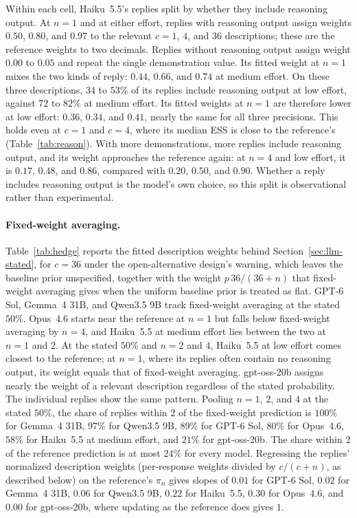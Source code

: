 Within each cell, Haiku~5.5's replies split by whether they include reasoning output. At $n = 1$ and at either effort, replies with reasoning output assign weights $0.50$, $0.80$, and $0.97$ to the relevant $c = 1$, $4$, and $36$ descriptions; these are the reference weights to two decimals. Replies without reasoning output assign weight $0.00$ to $0.05$ and repeat the single demonstration value. Its fitted weight at $n = 1$ mixes the two kinds of reply: $0.44$, $0.66$, and $0.74$ at medium effort. On these three descriptions, $34$ to $53\%$ of its replies include reasoning output at low effort, against $72$ to $82\%$ at medium effort. Its fitted weights at $n = 1$ are therefore lower at low effort: $0.36$, $0.34$, and $0.41$, nearly the same for all three precisions. This holds even at $c=1$ and $c=4$, where its median ESS is close to the reference's (Table~\ref{tab:reason}). With more demonstrations, more replies include reasoning output, and its weight approaches the reference again: at $n = 4$ and low effort, it is $0.17$, $0.48$, and $0.86$, compared with $0.20$, $0.50$, and $0.90$. Whether a reply includes reasoning output is the model's own choice, so this split is observational rather than experimental.

\paragraph{Fixed-weight averaging.}
Table~\ref{tab:hedge} reports the fitted description weights behind Section~\ref{sec:llm-stated}, for $c=36$ under the open-alternative design's warning, which leaves the baseline prior unspecified, together with the weight $p\,36/(36+n)$ that fixed-weight averaging gives when the uniform baseline prior is treated as flat. GPT-6 Sol, Gemma~4 31B, and Qwen3.5 9B track fixed-weight averaging at the stated $50\%$. Opus~4.6 starts near the reference at $n=1$ but falls below fixed-weight averaging by $n=4$, and Haiku~5.5 at medium effort lies between the two at $n=1$ and $2$. At the stated $50\%$ and $n=2$ and $4$, Haiku~5.5 at low effort comes closest to the reference; at $n=1$, where its replies often contain no reasoning output, its weight equals that of fixed-weight averaging. gpt-oss-20b assigns nearly the weight of a relevant description regardless of the stated probability. The individual replies show the same pattern. Pooling $n=1$, $2$, and $4$ at the stated $50\%$, the share of replies within $2$ of the fixed-weight prediction is $100\%$ for Gemma~4 31B, $97\%$ for Qwen3.5 9B, $89\%$ for GPT-6 Sol, $80\%$ for Opus~4.6, $58\%$ for Haiku~5.5 at medium effort, and $21\%$ for gpt-oss-20b. The share within $2$ of the reference prediction is at most $24\%$ for every model. Regressing the replies' normalized description weights (per-response weights divided by $c/(c+n)$, as described below) on the reference's $\pi_n$ gives slopes of $0.01$ for GPT-6 Sol, $0.02$ for Gemma~4 31B, $0.06$ for Qwen3.5 9B, $0.22$ for Haiku~5.5, $0.30$ for Opus~4.6, and $0.00$ for gpt-oss-20b, where updating as the reference does gives $1$.


